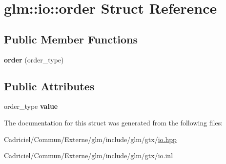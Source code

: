 \hypertarget{structglm_1_1io_1_1order}{}\section{glm\+:\+:io\+:\+:order Struct Reference}
\label{structglm_1_1io_1_1order}
\subsection*{Public Member Functions}
\begin{DoxyCompactItemize}
\item 
{\bfseries order} (order\+\_\+type)\hypertarget{structglm_1_1io_1_1order_a06813d404c975865fdd3a77146268a1f}{}\label{structglm_1_1io_1_1order_a06813d404c975865fdd3a77146268a1f}

\end{DoxyCompactItemize}
\subsection*{Public Attributes}
\begin{DoxyCompactItemize}
\item 
order\+\_\+type {\bfseries value}\hypertarget{structglm_1_1io_1_1order_aa8788dd0568bacd081d02bd5aca9889b}{}\label{structglm_1_1io_1_1order_aa8788dd0568bacd081d02bd5aca9889b}

\end{DoxyCompactItemize}


The documentation for this struct was generated from the following files\+:\begin{DoxyCompactItemize}
\item 
Cadriciel/\+Commun/\+Externe/glm/include/glm/gtx/\hyperlink{io_8hpp}{io.\+hpp}\item 
Cadriciel/\+Commun/\+Externe/glm/include/glm/gtx/io.\+inl\end{DoxyCompactItemize}
